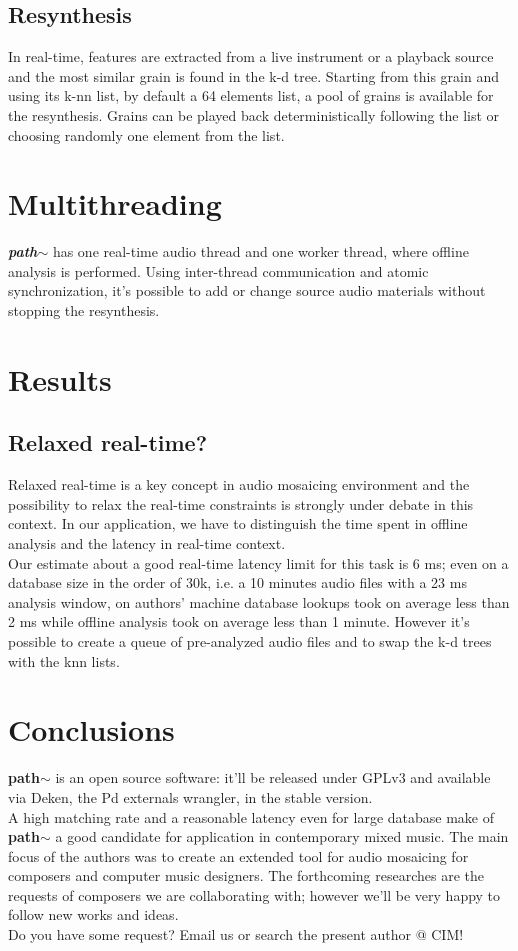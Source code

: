 \documentclass[a0,portrait]{a0poster}
\begin{document}
\begin{multicols}{2}
\subsection*{Resynthesis}
In real-time, features are extracted from a live instrument or a playback source and the most similar grain is found in the k-d tree. Starting from this grain and using its k-nn list, by default a 64 elements list, a pool of grains is available for the resynthesis. Grains can be played back deterministically following the list or choosing randomly one element from the list.

\section*{Multithreading}
\textbf{\emph{path$\sim$}} has one real-time audio thread and one worker thread, where offline analysis is performed. Using inter-thread communication and atomic synchronization, it's possible to add or change source audio materials without stopping the resynthesis. 

\section*{Results}
\subsection*{Relaxed real-time?}
Relaxed real-time is a key concept in audio mosaicing environment and the possibility to relax the real-time constraints is strongly under debate in this context. In our application, we have to distinguish the time spent in offline analysis and the latency in real-time context. \\
Our estimate about a good real-time latency limit for this task is 6 ms; even on a database size in the order of 30k, i.e. a 10 minutes audio files with a 23 ms analysis window, on authors' machine database lookups took on average less than 2 ms while offline analysis took on average less than 1 minute. However it's possible to create a queue of pre-analyzed audio files and to swap the k-d trees with the knn lists.

\section*{Conclusions}

\textbf{path$\sim$} is an open source software: it'll be released under GPLv3 and available via Deken, the Pd externals wrangler, in the stable version. \\
A high matching rate and a reasonable latency even for large database make of \textbf{path$\sim$} a good candidate for application in contemporary mixed music. The main focus of the authors was to create an extended tool for audio mosaicing for composers and computer music designers. The forthcoming researches are the requests of composers we are collaborating with; however we'll be very happy to follow new works and ideas. \\
Do you have some request? Email us or search the present author @ CIM! 


\end{multicols}
\end{document}
